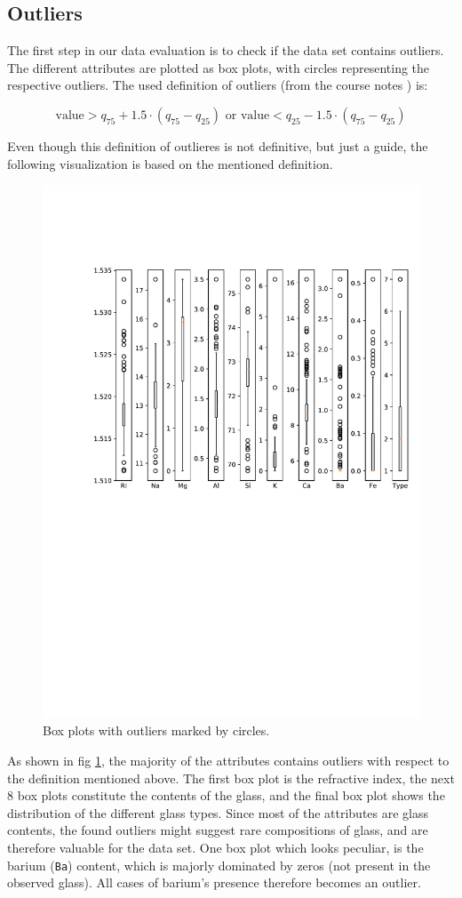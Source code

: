 \subsection{Outliers}

The first step in our data evaluation is to check if the data set contains outliers. The different attributes are plotted as box plots, with circles representing the respective outliers.
The used definition of outliers (from the course notes \cite{coursenotes}) is: 

\begin{equation*}
   \text{value} > q_{75} + 1.5 \cdot (q_{75} - q_{25}) \text{ or value} < q_{25} - 1.5 \cdot (q_{75} - q_{25})
\end{equation*}

Even though this definition of outlieres is not definitive, but just a guide, the following visualization is based on the mentioned definition. 

\begin{figure}[H]
    \centering
    \includegraphics[width=0.8\linewidth]{fig/boxplots.pdf}
    \caption{Box plots with outliers marked by circles.}
    \label{fig:outliers}
\end{figure}

As shown in fig \ref{fig:outliers}, the majority of the attributes contains outliers with respect to the definition mentioned above. The first box plot is the refractive index, the next 8 box plots constitute the contents of the glass, and the final box plot shows the distribution of the different glass types. Since most of the attributes are glass contents, the found outliers might suggest rare compositions of glass, and are therefore valuable for the data set. One box plot which looks peculiar, is the barium (\texttt{Ba}) content, which is majorly dominated by zeros (not present in the observed glass). All cases of barium's presence therefore becomes an outlier.